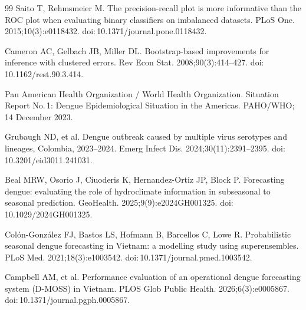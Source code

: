 \documentclass[11pt,a4paper]{article}
\begin{document}
\begin{thebibliography}{99}
 Saito T, Rehmsmeier M. The precision-recall plot is more informative than the ROC plot when evaluating binary classifiers on imbalanced datasets. PLoS One. 2015;10(3):e0118432. doi:\,10.1371/journal.pone.0118432.

 Cameron AC, Gelbach JB, Miller DL. Bootstrap-based improvements for inference with clustered errors. Rev Econ Stat. 2008;90(3):414--427. doi:\,10.1162/rest.90.3.414.

 Pan American Health Organization / World Health Organization. Situation Report No.\,1: Dengue Epidemiological Situation in the Americas. PAHO/WHO; 14 December 2023.

 Grubaugh ND, et al. Dengue outbreak caused by multiple virus serotypes and lineages, Colombia, 2023--2024. Emerg Infect Dis. 2024;30(11):2391--2395. doi:\,10.3201/eid3011.241031.

 Beal MRW, Osorio J, Ciuoderis K, Hernandez-Ortiz JP, Block P. Forecasting dengue: evaluating the role of hydroclimate information in subseasonal to seasonal prediction. GeoHealth. 2025;9(9):e2024GH001325. doi:\,10.1029/2024GH001325.

 Col\'{o}n-Gonz\'{a}lez FJ, Bastos LS, Hofmann B, Barcellos C, Lowe R. Probabilistic seasonal dengue forecasting in Vietnam: a modelling study using superensembles. PLoS Med. 2021;18(3):e1003542. doi:\,10.1371/journal.pmed.1003542.

 Campbell AM, et al. Performance evaluation of an operational dengue forecasting system (D-MOSS) in Vietnam. PLOS Glob Public Health. 2026;6(3):e0005867. doi:\,10.1371/journal.pgph.0005867.

\end{thebibliography}
\endgroup

\clearpage
\end{document}
